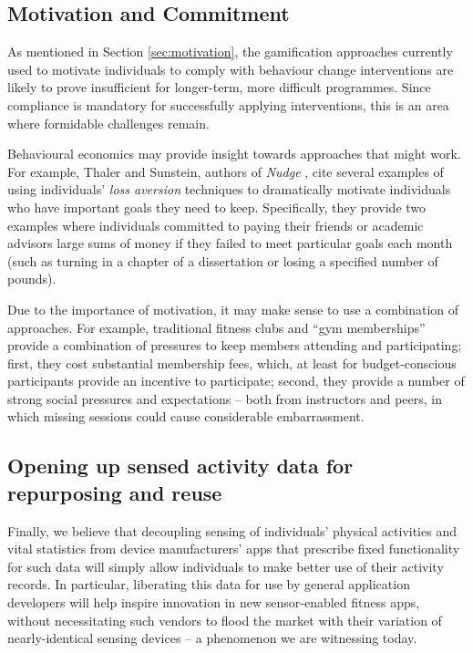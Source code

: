 \documentclass{sig-alternate}
\begin{document}

\subsection{Motivation and Commitment}

As mentioned in Section \ref{sec:motivation}, the gamification
approaches currently used to motivate individuals to comply with
behaviour change interventions are likely to prove insufficient for
longer-term, more difficult programmes. Since compliance is mandatory
for successfully applying interventions, this is an area where
formidable challenges remain.

Behavioural economics may provide insight towards approaches that
might work.  For example, Thaler and Sunstein, authors of \emph{Nudge}
\cite{thaler2008nudge}, cite several examples of using individuals' \emph{loss
  aversion} techniques to dramatically motivate individuals who have
important goals they need to keep.  Specifically, they provide two
examples where individuals committed to paying their friends or
academic advisors large sums of money if they failed to meet
particular goals each month (such as turning in a chapter of a
dissertation or losing a specified number of pounds).

Due to the importance of motivation, it may make sense to use a
combination of approaches.  For example, traditional fitness clubs and
``gym memberships'' provide a combination of pressures to keep members
attending and participating; first, they cost substantial membership
fees, which, at least for budget-conscious participants provide an
incentive to participate; second, they provide a number of strong
social pressures and expectations -- both from instructors and peers,
in which missing sessions could cause considerable embarrassment.

\subsection{Opening up sensed activity data for repurposing and reuse}

Finally, we believe that decoupling sensing of individuals' physical
activities and vital statistics from device manufacturers' apps that
prescribe fixed functionality for such data will simply allow
individuals to make better use of their activity records.  In
particular, liberating this data for use by general application
developers will help inspire innovation in new sensor-enabled fitness
apps, without necessitating such vendors to flood the market with
their variation of nearly-identical sensing devices -- a phenomenon we
are witnessing today.
\end{document}
